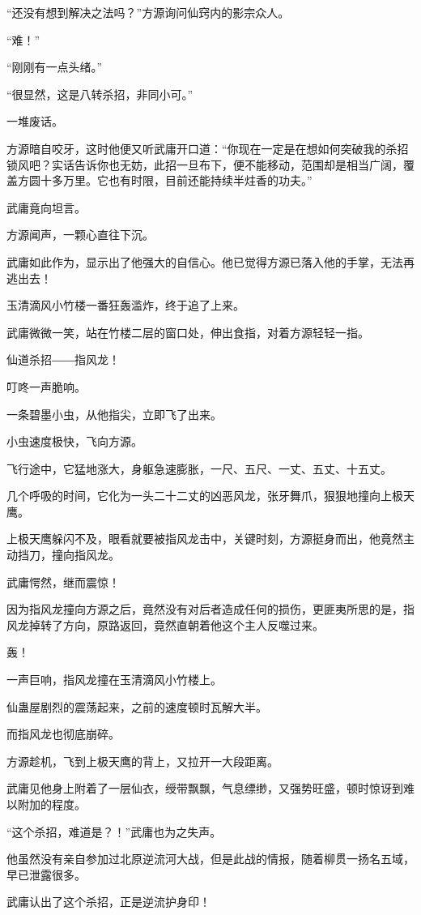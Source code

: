 \begin{this_body}
“还没有想到解决之法吗？”方源询问仙窍内的影宗众人。

“难！”

“刚刚有一点头绪。”

“很显然，这是八转杀招，非同小可。”

一堆废话。

方源暗自咬牙，这时他便又听武庸开口道：“你现在一定是在想如何突破我的杀招锁风吧？实话告诉你也无妨，此招一旦布下，便不能移动，范围却是相当广阔，覆盖方圆十多万里。它也有时限，目前还能持续半炷香的功夫。”

武庸竟向坦言。

方源闻声，一颗心直往下沉。

武庸如此作为，显示出了他强大的自信心。他已觉得方源已落入他的手掌，无法再逃出去！

玉清滴风小竹楼一番狂轰滥炸，终于追了上来。

武庸微微一笑，站在竹楼二层的窗口处，伸出食指，对着方源轻轻一指。

仙道杀招――指风龙！

叮咚一声脆响。

一条碧墨小虫，从他指尖，立即飞了出来。

小虫速度极快，飞向方源。

飞行途中，它猛地涨大，身躯急速膨胀，一尺、五尺、一丈、五丈、十五丈。

几个呼吸的时间，它化为一头二十二丈的凶恶风龙，张牙舞爪，狠狠地撞向上极天鹰。

上极天鹰躲闪不及，眼看就要被指风龙击中，关键时刻，方源挺身而出，他竟然主动挡刀，撞向指风龙。

武庸愕然，继而震惊！

因为指风龙撞向方源之后，竟然没有对后者造成任何的损伤，更匪夷所思的是，指风龙掉转了方向，原路返回，竟然直朝着他这个主人反噬过来。

轰！

一声巨响，指风龙撞在玉清滴风小竹楼上。

仙蛊屋剧烈的震荡起来，之前的速度顿时瓦解大半。

而指风龙也彻底崩碎。

方源趁机，飞到上极天鹰的背上，又拉开一大段距离。

武庸见他身上附着了一层仙衣，绶带飘飘，气息缥缈，又强势旺盛，顿时惊讶到难以附加的程度。

“这个杀招，难道是？！”武庸也为之失声。

他虽然没有亲自参加过北原逆流河大战，但是此战的情报，随着柳贯一扬名五域，早已泄露很多。

武庸认出了这个杀招，正是逆流护身印！


\end{this_body}
